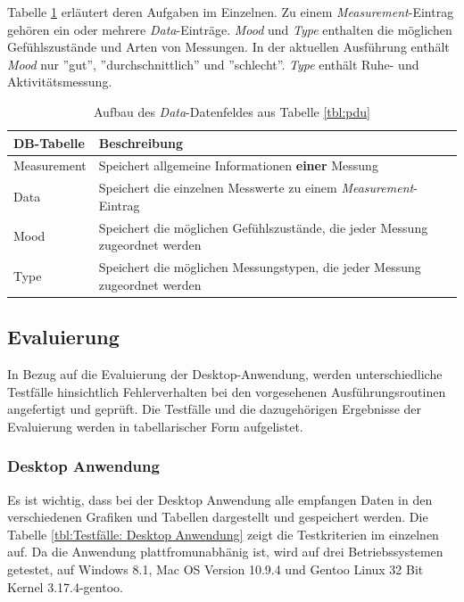 Tabelle \ref{tbl:database-entities} erläutert deren Aufgaben im Einzelnen. Zu einem \textit{Measurement}-Eintrag gehören ein oder mehrere \textit{Data}-Einträge. \textit{Mood} und \textit{Type} enthalten die möglichen Gefühlszustände und Arten von Messungen. In der aktuellen Ausführung enthält \textit{Mood} nur ''gut'', ''durchschnittlich'' und ''schlecht''. \textit{Type} enthält Ruhe- und Aktivitätsmessung.  
\begin{table}[h]
	\centering
		\begin{tabularx}{\textwidth}{l|X}
			\hline
			DB-Tabelle & Beschreibung \\
			\hline
			\hline
			Measurement & Speichert allgemeine Informationen \textbf{einer} Messung\\
			\hline
			Data & Speichert die einzelnen Messwerte zu einem \textit{Measurement}-Eintrag\\
			\hline
			Mood & Speichert die möglichen Gefühlszustände, die jeder Messung zugeordnet werden\\
			\hline
			Type & Speichert die möglichen Messungstypen, die jeder Messung zugeordnet werden\\
			\hline
		\end{tabularx}
		\caption{Aufbau des \textit{Data}-Datenfeldes aus Tabelle \ref{tbl:pdu}}
		\label{tbl:database-entities}			
\end{table}

\subsection{Evaluierung} \label{sec:Evaluierung}

In Bezug auf die Evaluierung der Desktop-Anwendung, werden unterschiedliche Testfälle hinsichtlich Fehlerverhalten bei den vorgesehenen Ausführungsroutinen angefertigt und geprüft. Die Testfälle und die dazugehörigen Ergebnisse der Evaluierung werden in tabellarischer Form  aufgelistet.

\subsubsection{Desktop Anwendung} \label{sec:Desktop Anwendung}

Es ist wichtig, dass bei der Desktop Anwendung alle empfangen Daten in den verschiedenen Grafiken und Tabellen dargestellt und gespeichert werden. Die Tabelle \ref{tbl:Testfälle: Desktop Anwendung} zeigt die Testkriterien im einzelnen auf. Da die Anwendung plattfromunabhänig ist, wird auf drei Betriebssystemen getestet, auf Windows 8.1, Mac OS Version 10.9.4 und Gentoo Linux 32 Bit Kernel 3.17.4-gentoo.

